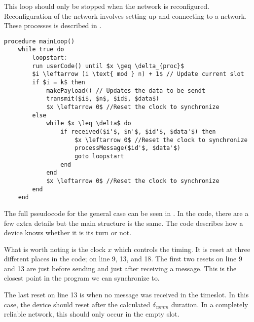 
This loop should only be stopped when the network is reconfigured. 
Reconfiguration of the network involves setting up and connecting to a network. 
These processes is described in .

\begin{lstlisting}[style=pseudocode,mathescape=true,float,floatplacement=H,
    label={lst:general_case}, caption={Pseudocode example of the main loop}] 
procedure mainLoop()
    while true do
        loopstart:
        run userCode() until $x \geq \delta_{proc}$
        $i \leftarrow (i \text{ mod } n) + 1$ // Update current slot
        if $i = k$ then
            makePayload() // Updates the data to be sendt
            transmit($i$, $n$, $id$, $data$)
            $x \leftarrow 0$ //Reset the clock to synchronize
        else
            while $x \leq \delta$ do
                if received($i'$, $n'$, $id'$, $data'$) then
                    $x \leftarrow 0$ //Reset the clock to synchronize
                    processMessage($id'$, $data'$)
                    goto loopstart
                end
            end
            $x \leftarrow 0$ //Reset the clock to synchronize
        end
    end
\end{lstlisting}  

The full pseudocode for the general case can be seen in . 
In the code, there are a few extra details but the main structure is the same. 
The code describes how a device knows whether it is its turn or not. 

What is worth noting is the clock $x$ which controls the timing. 
It is reset at three different places in the code; on line 9, 13, and 18. 
The first two resets on line 9 and 13 are just before sending and just after receiving a message. 
This is the closest point in the program we can synchronize to. 

The last reset on line 13 is when no message was received in the timeslot. 
In this case, the device should reset after the calculated $\delta_{comm}$ duration. 
In a completely reliable network, this should only occur in the empty slot.

            
